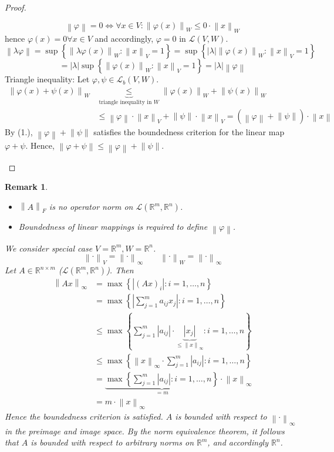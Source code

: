 \documentclass{article}
\newtheorem{remark}{Remark}  \numberwithin{remark}{section}
\newcommand{\set}[1]{\left\{#1\right\}}
\newcommand{\norm}[1]{\left\|#1\right\|}
\newcommand{\card}[1]{\left|#1\right|}
\begin{document}
\begin{proof}
\begin{enumerate}
      \[ \norm\varphi = 0 \iff \forall x \in V: \norm{\varphi(x)}_W \leq 0 \cdot \norm{x}_W \]
      hence $\varphi(x) = 0 \forall x \in V$ and accordingly, $\varphi = 0$ in $\mathcal L(V, W)$.
      \[ \norm{\lambda \varphi} = \sup\set{\norm{\lambda \varphi(x)}_W: \norm{x}_V = 1} = \sup\set{\card{\lambda} \norm{\varphi(x)}_W: \norm{x}_V = 1} \]
      \[ = \card{\lambda} \sup\set{\norm{\varphi(x)}_W: \norm{x}_V = 1} = \card{\lambda} \norm{\varphi} \]
      Triangle inequality:
      Let $\varphi, \psi \in \mathcal L_b(V,W)$.
      \begin{align*}
        \norm{\varphi(x) + \psi(x)}_W
          &\underbrace{\leq}_{\text{triangle inequality in } W} \norm{\varphi(x)}_W + \norm{\psi(x)}_W \\
          &\leq \norm \varphi \cdot \norm{x}_V + \norm \psi \cdot \norm{x}_V = (\norm{\varphi} + \norm{\psi}) \cdot \norm{x}
      \end{align*}
      By (1.), $\norm{\varphi} + \norm{\psi}$ satisfies the boundedness criterion for the linear map $\varphi + \psi$.
      Hence, $\norm{\varphi + \psi} \leq \norm{\varphi} + \norm{\psi}$.
  \end{enumerate}
\end{proof}

\begin{remark}
  \begin{itemize}
    \item $\norm{A}_F$ is no operator norm on $\mathcal L(\mathbb R^m, \mathbb R^n)$.
    \item Boundedness of linear mappings is required to define $\norm{\varphi}$.
  \end{itemize}
  We consider special case $V = \mathbb R^m, W = \mathbb R^n$.
  \[ \norm{\cdot}_V = \norm{\cdot}_\infty \qquad \norm{\cdot}_W = \norm{\cdot}_\infty \]
  Let $A \in \mathbb R^{n\times m}$ ($\mathcal L(\mathbb R^m, \mathbb R^n)$).
  Then
  \begin{align*}
    \norm{Ax}_\infty
      &= \max\set{\card{(Ax)_i}: i = 1, \dots, n} \\
      &= \max\set{\card{\sum_{j=1}^m a_{ij} x_j}: i = 1, \dots, n} \\
      &\leq \max\set{\sum_{j=1}^m \card{a_{ij}} \cdot \underbrace{\card{x_j}}_{\leq \norm{x}_{\infty}}: i = 1, \dots, n} \\
      &\leq \max\set{\norm{x}_\infty \cdot \sum_{j=1}^m \card{a_{ij}}: i = 1, \dots, n} \\
      &= \underbrace{\max\set{\sum_{j=1}^m \card{a_{ij}}: i = 1, \dots, n}}_{= m} \cdot \norm{x}_\infty \\
      &= m \cdot \norm{x}_\infty
  \end{align*}
  Hence the boundedness criterion is satisfied.
  $A$ is bounded with respect to $\norm{\cdot}_\infty$ in the preimage and image space.
  By the norm equivalence theorem, it follows that $A$ is bounded with respect to arbitrary norms on $\mathbb R^m$, and accordingly $\mathbb R^n$.
\end{remark}
\end{document}
